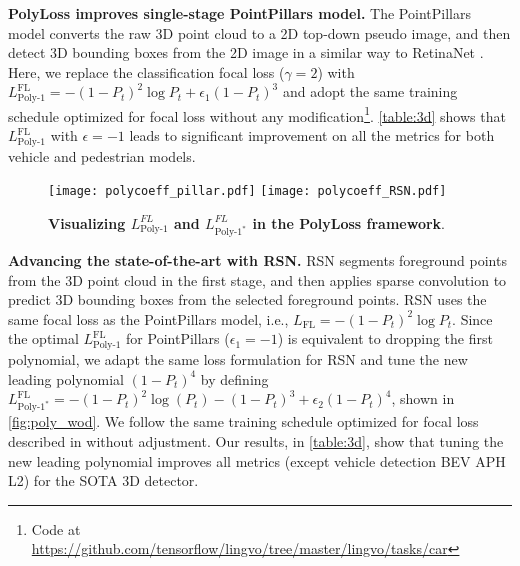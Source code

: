 \textbf{PolyLoss improves single-stage PointPillars model.} The PointPillars model converts the raw 3D point cloud to a 2D top-down pseudo image, and then detect 3D bounding boxes from the 2D image in a similar way to RetinaNet \citep{lin2017focal}. Here, we replace the classification focal loss ($\gamma=2$) with $L^{\text{FL}}_{\text{Poly-1}} = -(1 - P_t)^2 \log P_t + \epsilon_1(1 - P_t)^3$ and adopt the same training schedule optimized for focal loss without any modification\footnote{Code at \url{https://github.com/tensorflow/lingvo/tree/master/lingvo/tasks/car}}. \autoref{table:3d} shows that $L^{\text{FL}}_{\text{Poly-1}}$ with $\epsilon=-1$  leads to significant improvement on all the metrics for both vehicle and pedestrian models. 
\begin{wrapfigure}{r}{0.42\textwidth}
  \centering
  \vspace{-10pt}
  \texttt{[image: polycoeff\_pillar.pdf]}
  \texttt{[image: polycoeff\_RSN.pdf]}
  \caption{\textbf{Visualizing $L^{FL}_{\text{Poly-1}}$ and  $L^{FL}_{\text{Poly-1}^*}$ in the PolyLoss framework}. }
  \vspace{-10pt}
  \label{fig:poly_wod}
\end{wrapfigure}

\vspace{-5pt}
\textbf{Advancing the state-of-the-art with RSN.}
RSN segments foreground points from the 3D point cloud in the first stage, and then applies sparse convolution to predict 3D bounding boxes from the selected foreground points. RSN uses the same focal loss as the PointPillars model, i.e., $L_{\text{FL}}=-(1 - P_t)^2 \log P_t$. Since the optimal $L^{\text{FL}}_{\text{Poly-1}}$ for PointPillars ($\epsilon_1=-1$) is equivalent to dropping the first polynomial, we adapt the same loss formulation for RSN and tune the new leading polynomial $(1-P_t)^4$ by defining $L^{\text{FL}}_{\text{Poly-1}^*}=-(1-P_t)^2\log(P_t) - (1-P_t)^3 + \epsilon_2(1-P_t)^4$, shown in \autoref{fig:poly_wod}. We follow the same training schedule optimized for focal loss described in \citet{rsn} without adjustment. Our results, in \autoref{table:3d}, show that tuning the new leading polynomial improves all metrics (except vehicle detection BEV APH L2) for the SOTA 3D detector.